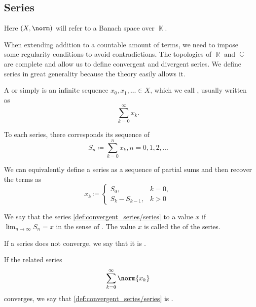 \subsection{Series}\label{subsec:series}

Here \( (X, \norm) \) will refer to a Banach space over \( \BbbK \).

\begin{definition}\label{def:convergent_series}
  When extending addition to a countable amount of terms, we need to impose some regularity conditions to avoid contradictions. The topologies of \( \BbbR \) and \( \BbbC \) are complete and allow us to define convergent and divergent series. We define series in great generality because the theory easily allows it.

  A  or simply  is an infinite sequence \( x_0, x_1, \ldots \in X \), which we call , usually written as
  \begin{equation}\label{def:convergent_series/series}
    \sum_{k=0}^\infty x_k.
  \end{equation}

  To each series, there corresponds its sequence of 
  \begin{equation*}
    S_n \coloneqq \sum_{k=0}^n x_k, n = 0, 1, 2, \ldots
  \end{equation*}

  We can equivalently define a series as a sequence of partial sums and then recover the terms as
  \begin{equation*}
    x_k \coloneqq \begin{cases}
      S_0,           & k = 0, \\
      S_k - S_{k-1}, & k > 0
    \end{cases}
  \end{equation*}

  We say that the series \eqref{def:convergent_series/series}  to a value \( x \) if \( \lim_{n \to \infty} S_n = x \) in the sense of . The value \( x \) is called the  of the series.

  If a series does not converge, we say that it is .

  If the related series
  \begin{equation}\label{def:convergent_series/absolute_series}
    \sum_{k=0}^\infty \norm{x_k}
  \end{equation}
  converges, we say that \eqref{def:convergent_series/series} is .
\end{definition}

